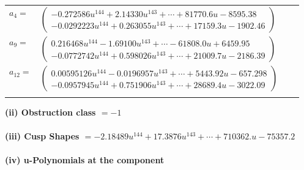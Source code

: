 \documentclass[1p]{elsarticle_modified}
\theoremstyle{definition}
\begin{document}
\begin{tabular}{m{7pt} m{180pt} m{7pt} m{180pt} }
\flushright $a_{4}=$&$\begin{pmatrix}-0.272586 u^{144}+2.14330 u^{143}+\cdots+81770.6 u-8595.38\\-0.0292223 u^{144}+0.263055 u^{143}+\cdots+17159.3 u-1902.46\end{pmatrix}$ \\
\flushright $a_{9}=$&$\begin{pmatrix}0.216468 u^{144}-1.69100 u^{143}+\cdots-61808.0 u+6459.95\\-0.0772742 u^{144}+0.598026 u^{143}+\cdots+21009.7 u-2186.39\end{pmatrix}$ \\
\flushright $a_{12}=$&$\begin{pmatrix}0.00595126 u^{144}-0.0196957 u^{143}+\cdots+5443.92 u-657.298\\-0.0957945 u^{144}+0.751906 u^{143}+\cdots+28689.4 u-3022.09\end{pmatrix}$\\&\end{tabular}
\flushleft \textbf{(ii) Obstruction class $= -1$}\\~\\
\flushleft \textbf{(iii) Cusp Shapes $= -2.18489 u^{144}+17.3876 u^{143}+\cdots+710362. u-75357.2$}\\~\\
\newpage\renewcommand{\arraystretch}{1}
\flushleft \textbf{(iv) u-Polynomials at the component}\newline \\
\end{document}
